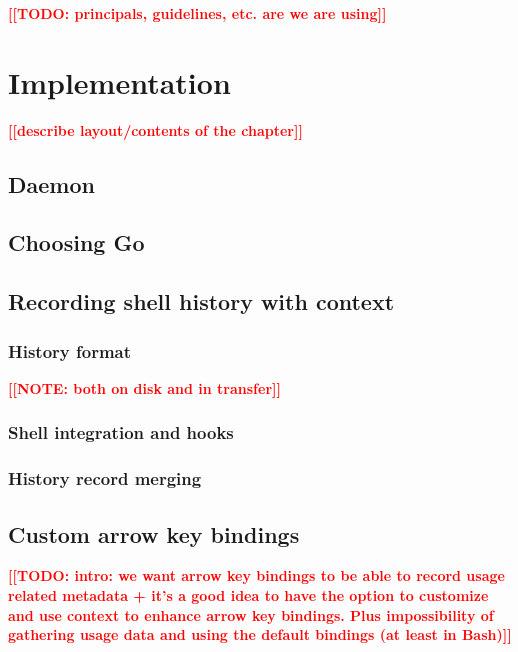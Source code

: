 \documentclass[thesis=M,english]{FITthesis}[2012/10/20]
\newcommand{\todotext}[1]{\textcolor{red}{\textbf{[[#1]]}}}
\newcommand{\blind}[1][1]{\textcolor{mygray}{\Blindtext[#1][1]}}
\begin{document}
\todotext{TODO: principals, guidelines, etc. are we are using}

\blind[3]

\chapter{Implementation}
\todotext{describe layout/contents of the chapter}

\blind

\section{Daemon}

\blind

\section{Choosing Go}

\blind[3]

\section{Recording shell history with context}

\blind

\subsection{History format}

\todotext{NOTE: both on disk and in transfer}

\blind

\subsection{Shell integration and hooks}

\blind

\subsection{History record merging}

\blind

\section{Custom arrow key bindings}

\todotext{TODO: intro: we want arrow key bindings to be able to record usage related metadata + it's a good idea to have the option to customize and use context to enhance arrow key bindings. Plus impossibility of gathering usage data and using the default bindings (at least in Bash)}
\end{document}
